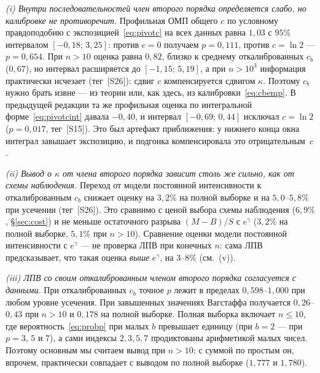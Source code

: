 \documentclass[11pt,a4paper]{article}
\theoremstyle{plain}
\theoremstyle{remark}
\newcommand{\eg}{e^{\gamma}}
\begin{document}
\emph{(i) Внутри последовательностей член второго порядка определяется слабо, но
калибровке не противоречит.} Профильная ОМП общего $c$ по условному правдоподобию
с экспозицией~\eqref{eq:pivotc} на всех данных равна $1{,}03$ с $95\%$
интервалом $[-0{,}18;\,3{,}25]$: против $c=0$ получаем $p=0{,}111$, против $c=\ln2$
--- $p=0{,}654$. При $n>10$ оценка равна $0{,}82$, близко к среднему
откалиброванных $c_b$ ($0{,}67$), но интервал расширяется до $[-1{,}15;\,5{,}19]$, а при
$n>10^3$ информация практически исчезает (тег~[S26]): сдвиг $c$ компенсируется
сдвигом $\kappa$. Поэтому $c_b$ нужно брать извне --- из теории или, как здесь, из
калибровки~\eqref{eq:cbemp}. В предыдущей редакции та же профильная оценка по
интегральной форме~\eqref{eq:pivotcint} давала $-0{,}40$, и интервал
$[-0{,}69;\,0{,}44]$ исключал $c=\ln2$ ($p=0{,}017$, тег~[S15]). Это был артефакт
приближения: у нижнего конца окна интеграл завышает экспозицию, и подгонка
компенсировала это отрицательным~$c$.

\emph{(ii) Вывод о $\kappa$ от члена второго порядка зависит столь же сильно, как
от схемы наблюдения.} Переход от модели постоянной интенсивности к
откалиброванным $c_b$ снижает оценку на $3{,}2\%$ на полной выборке и на
$5{,}0$--$5{,}8\%$ при усечении (тег~[S26]). Это сравнимо с ценой выбора схемы
наблюдения ($6{,}9\%$, \S\ref{sec:cost}) и не меньше остаточного разрыва $(M-B)/S$
с $\eg$ ($3{,}2\%$ на полной выборке, $5{,}1\%$ при $n>10$). Сравнение оценки
модели постоянной интенсивности с $\eg$ --- не проверка ЛПВ при конечных $n$: сама
ЛПВ предсказывает, что такая оценка \emph{выше} $\eg$, на $3$--$8\%$ (см.~(v)).

\emph{(iii) ЛПВ со своим откалиброванным членом второго порядка согласуется с
данными.} При откалиброванных $c_b$ точное $p$ лежит в пределах
$0{,}598$--$1{,}000$ при любом уровне усечения. При завышенных значениях Вагстаффа
получается $0{,}26$--$0{,}43$ при $n>10$ и $0{,}178$ на полной выборке. Полная
выборка включает $n\le10$, где вероятность~\eqref{eq:probp} при малых $b$
превышает единицу (при $b=2$ --- при $p=3$, $5$ и $7$), а сами индексы $2,3,5,7$
продиктованы арифметикой малых чисел. Поэтому основным мы считаем вывод при
$n>10$; с суммой по простым он, впрочем, практически совпадает с выводом по полной
выборке ($1{,}777$ и $1{,}780$).
\end{document}
